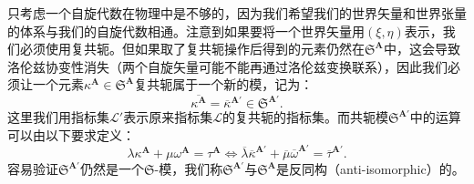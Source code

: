 只考虑一个自旋代数在物理中是不够的，因为我们希望我们的世界矢量和世界张量的体系与我们的自旋代数相通。注意到如果要将一个世界矢量用$( \xi ,\eta )$表示，我们必须使用复共轭。但如果取了复共轭操作后得到的元素仍然在$\mathfrak{S}^{\boldsymbol{A}}$中，这会导致洛伦兹协变性消失（两个自旋矢量可能不能再通过洛伦兹变换联系），因此我们必须让一个元素$\kappa ^{\boldsymbol{A}} \in \mathfrak{S}^{\boldsymbol{A}}$复共轭属于一个新的模，记为：
\begin{equation*}
	\overline{\kappa ^{\boldsymbol{A}}} =\overline{\kappa }^{\boldsymbol{A} '} \in \mathfrak{S}^{\boldsymbol{A} '} .
\end{equation*}
这里我们用指标集$\mathcal{L} '$表示原来指标集$\mathcal{L}$的复共轭的指标集。而共轭模$\mathfrak{S}^{\boldsymbol{A} '}$中的运算可以由以下要求定义：
\begin{equation*}
	\lambda \kappa ^{\boldsymbol{A}} +\mu \omega ^{\boldsymbol{A}} =\tau ^{\boldsymbol{A}} \Leftrightarrow \overline{\lambda }\overline{\kappa }^{\boldsymbol{A} '} +\overline{\mu }\overline{\omega }^{\boldsymbol{A} '} =\overline{\tau }^{\boldsymbol{A} '} .
\end{equation*}
容易验证$\mathfrak{S}^{\boldsymbol{A} '}$仍然是一个$\mathfrak{S}$-模，我们称$\mathfrak{S}^{\boldsymbol{A} '}$与$\mathfrak{S}^{\boldsymbol{A}}$是反同构（anti-isomorphic）的。



